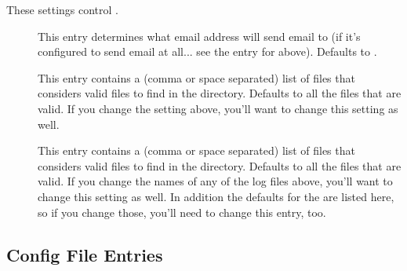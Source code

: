 These settings control .

\begin{description}

\item[] \label{param:PreenAdmin}  This entry
  determines what email address  will send email to (if
  it's configured to send email at all... see the entry for
   above).  Defaults to .

\item[] \label{param:ValidSpoolFiles}  This
  entry contains a (comma or space separated) list of files that
   considers valid files to find in the 
  directory.  Defaults to all the files that are valid.  If you change
  the  setting above, you'll want to change this
  setting as well.
  
\item[] \label{param:ValidLogFiles} This
  entry contains a (comma or space separated) list of files that
   considers valid files to find in the 
  directory.  Defaults to all the files that are valid.  If you change
  the names of any of the log files above, you'll want to change this
  setting as well.  In addition the defaults for the
   are listed here, so if you change
  those, you'll need to change this entry, too.

\end{description}


\subsection{\label{sec:Collector-Config-File-Entries}
 Config File Entries}

